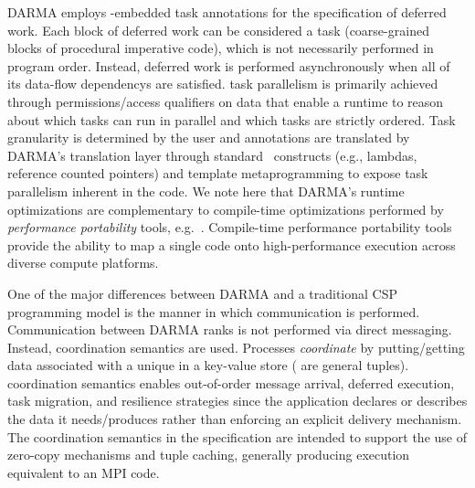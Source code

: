 \gls{DARMA} employs \CC-embedded task annotations for the specification of \gls{deferred
work}. Each block of \gls{deferred work} can be considered a task (coarse-grained blocks of 
\gls{procedural} \gls{imperative} code),  which is not necessarily performed in program order.   Instead,
\gls{deferred work} is performed asynchronously when all of its \glspl{data-flow dependency} are
satisfied.  \Gls{task parallelism} is primarily achieved through permissions/access qualifiers
on data that enable a runtime to reason about which tasks can run in parallel and which tasks are strictly ordered.
Task granularity is determined by the user and annotations are translated by \gls{DARMA}'s \gls{translation
layer} through standard \CC\ constructs (e.g., \glspl{lambda}, \glspl{reference counted pointer}) and \gls{template metaprogramming} to
expose \gls{task parallelism} inherent in the code.
We note here that \gls{DARMA}'s runtime optimizations are complementary to
compile-time optimizations performed by \emph{performance
portability} tools, e.g.~\cite{Kokkos,RAJA,TiDA}.  Compile-time performance
portability tools provide the ability to map a
single code onto high-performance execution across diverse compute platforms.


One of the major differences between \gls{DARMA} and a traditional \gls{CSP}
\gls{programming model} is the manner in which communication is performed.  
Communication between \gls{DARMA} \glspl{rank} is not performed via direct messaging.
Instead, \gls{coordination semantics} are used.  Processes \emph{coordinate} by putting/getting
data associated with a unique  in a \gls{key-value store}
( are general \glspl{tuple}).  
\Gls{coordination semantics} enables out-of-order message arrival, deferred
execution, task migration, and resilience strategies 
since the application declares or describes the data it needs/produces rather than enforcing an explicit delivery mechanism.
The \gls{coordination semantics} in the specification are intended to support
the use of \gls{zero-copy} mechanisms and \gls{tuple} caching,
generally producing execution equivalent to an MPI  code. 

